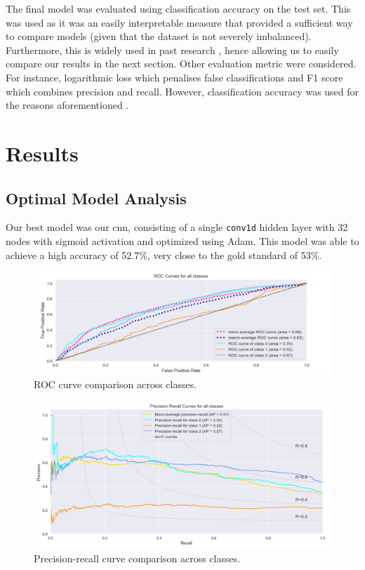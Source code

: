 \documentclass{article}
\newcommand{\sw}[1]{\texttt{#1}}
\begin{document}
The final model was evaluated using classification accuracy on the test set. This was used as it was an easily interpretable measure that provided a sufficient way to compare models (given that the dataset is not severely imbalanced). Furthermore, this is widely used in past research \cite{horvat2020use}, hence allowing us to easily compare our results in the next section. Other evaluation metric were considered. For instance, logarithmic loss which penalises false classifications and F1 score which combines precision and recall. However, classification accuracy was used for the reasons aforementioned \cite{mishramediummetrics}. 

\section{Results}
\label{results}

\subsection{Optimal Model Analysis}
\label{optimalmodel}

Our best model was our \gls{cnn}, consisting of a single \sw{conv1d} hidden layer with 32 nodes with sigmoid activation and optimized using Adam. This model was able to achieve a high accuracy of 52.7\%, very close to the gold standard of 53\%.

\begin{figure}[!htb]
    \centering
    \includegraphics[width=\linewidth]{Images/Figure 4.jpg}
    \caption{ROC curve comparison across classes.}
    \label{fig:ROC}
\end{figure}

\begin{figure}[!htb]
    \centering
    \includegraphics[width=\linewidth]{Images/Figure 5.jpg}
    \caption{Precision-recall curve comparison across classes.}
    \label{fig:precisionrecall}
\end{figure}
\end{document}
